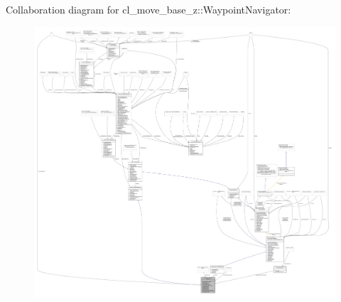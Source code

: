Collaboration diagram for cl\+\_\+move\+\_\+base\+\_\+z\+:\+:Waypoint\+Navigator\+:
\nopagebreak
\begin{figure}[H]
\begin{center}
\leavevmode
\includegraphics[width=350pt]{classcl__move__base__z_1_1WaypointNavigator__coll__graph}
\end{center}
\end{figure}

